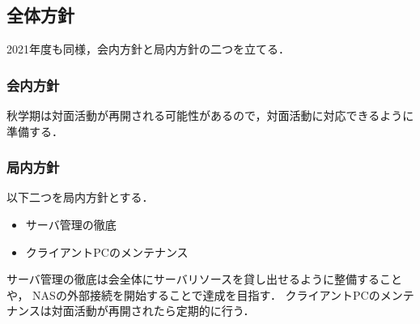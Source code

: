 \subsection*{全体方針}


2021年度も同様，会内方針と局内方針の二つを立てる．

\subsubsection*{会内方針}
秋学期は対面活動が再開される可能性があるので，対面活動に対応できるように準備する．

\subsubsection*{局内方針}
以下二つを局内方針とする．
\begin{itemize}
  \item サーバ管理の徹底
  \item クライアントPCのメンテナンス
\end{itemize}
サーバ管理の徹底は会全体にサーバリソースを貸し出せるように整備することや，
NASの外部接続を開始することで達成を目指す．
クライアントPCのメンテナンスは対面活動が再開されたら定期的に行う．
